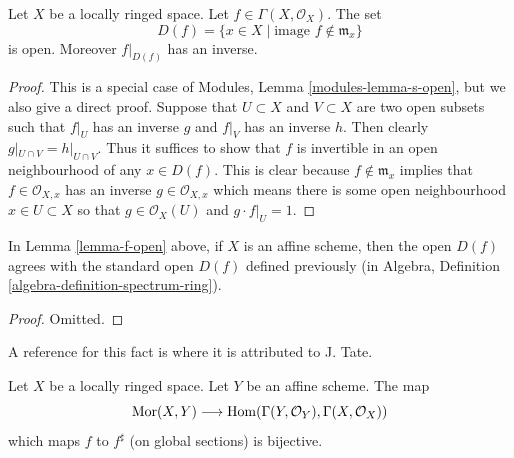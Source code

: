 \begin{lemma}
\label{lemma-f-open}
Let $X$ be a locally ringed space.
Let $f \in \Gamma(X, \mathcal{O}_X)$.
The set
$$
D(f) = \{x \in X \mid \text{image }f \not\in \mathfrak m_x\}
$$
is open. Moreover $f|_{D(f)}$ has an inverse.
\end{lemma}

\begin{proof}
This is a special case of Modules, Lemma \ref{modules-lemma-s-open}, but
we also give a direct proof.
Suppose that $U \subset X$ and $V \subset X$ are
two open subsets such that $f|_U$ has an inverse
$g$ and $f|_V$ has an inverse $h$. Then clearly
$g|_{U\cap V} = h|_{U\cap V}$. Thus it suffices
to show that $f$ is invertible in an open neighbourhood
of any $x \in D(f)$. This is clear because
$f \not \in \mathfrak m_x$ implies that $f \in \mathcal{O}_{X, x}$
has an inverse $g \in \mathcal{O}_{X, x}$ which means there
is some open neighbourhood $x \in U \subset X$ so
that $g \in \mathcal{O}_X(U)$ and $g\cdot f|_U = 1$.
\end{proof}

\begin{lemma}
\label{lemma-f-open-affine}
In Lemma \ref{lemma-f-open} above, if $X$ is an affine scheme,
then the open $D(f)$ agrees with the standard open $D(f)$
defined previously (in
Algebra, Definition \ref{algebra-definition-spectrum-ring}).
\end{lemma}

\begin{proof}
Omitted.
\end{proof}

\begin{lemma}
\label{lemma-morphism-into-affine}
\begin{reference}
A reference for this fact is \cite[II, Err 1, Prop. 1.8.1]{EGA}
where it is attributed to J. Tate.
\end{reference}
Let $X$ be a locally ringed space.
Let $Y$ be an affine scheme.
The map
$$
\mathop{\mathrm{Mor}}\nolimits(X, Y)
\longrightarrow
\mathop{\mathrm{Hom}}\nolimits(\Gamma(Y, \mathcal{O}_Y), \Gamma(X, \mathcal{O}_X))
$$
which maps $f$ to $f^\sharp$ (on global sections) is bijective.
\end{lemma}

